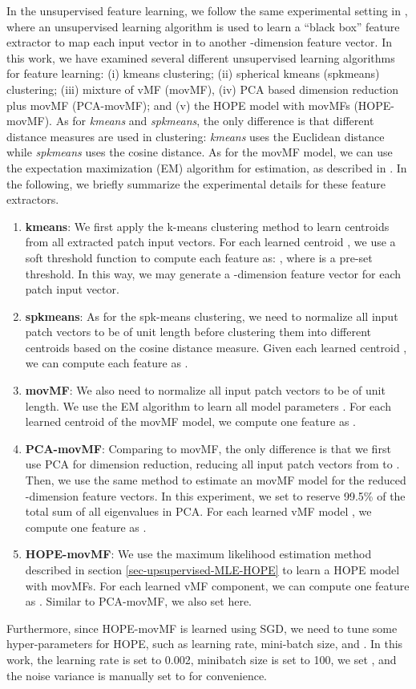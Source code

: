 \documentclass[11pt]{article}
\begin{document}
In the unsupervised feature learning, we follow the same experimental setting  in \cite{Coates2011}, where an unsupervised learning algorithm is used to learn a ``black box'' feature extractor to map each input vector in  to 
another -dimension feature vector. In this work, we have examined several different unsupervised learning algorithms for feature learning: (i) kmeans clustering; (ii) spherical kmeans (spkmeans) clustering; (iii) mixture of vMF (movMF), (iv) PCA based dimension reduction plus movMF (PCA-movMF); and (v) the HOPE model with movMFs (HOPE-movMF). As for {\em kmeans} and {\em spkmeans}, the only difference is that different distance measures are used in clustering: {\em kmeans} uses the Euclidean distance while {\em spkmeans} uses the cosine distance. As for the movMF model, we can use the expectation maximization (EM) algorithm for estimation, as described in \cite{Banerjee2005}. In the following, we  briefly summarize the experimental details for these feature extractors. 
 \begin{enumerate}
 	\item {\bf kmeans}: We first apply the k-means clustering method to learn  centroids  from all extracted patch input vectors. For each learned centroid ,  we use a soft threshold function to compute each feature as: , where  is a pre-set threshold. In this way, we may generate a -dimension feature vector for each patch input vector.  
 	\item {\bf spkmeans}: As for the spk-means clustering, we need to normalize all input patch vectors to be of unit length before clustering them into  different centroids based on the cosine distance measure.  Given each learned centroid , we can compute each feature as  .
 	\item {\bf movMF}: We also need to normalize all input patch vectors to be of unit length. We  use the EM algorithm to learn all model parameters . For each learned centroid  of the movMF model, we  compute one  feature as . 
 	\item {\bf PCA-movMF}:  Comparing to movMF, the only difference is that we first use PCA for dimension reduction, reducing all input patch vectors from  to . Then, we use the same method to estimate an movMF model for the reduced -dimension feature vectors. In this experiment, we set  to reserve 99.5\% of the total sum of all eigenvalues in PCA. For each learned vMF model , we  compute one  feature as . 
	\item {\bf HOPE-movMF}: We use the maximum likelihood estimation method described in section \ref{sec-upsupervised-MLE-HOPE} to learn a HOPE model with movMFs. For each learned vMF component,
we can compute one  feature as . Similar to PCA-movMF, we also set  here. 
 \end{enumerate}
Furthermore, since HOPE-movMF is learned using SGD,  we need to tune some hyper-parameters for HOPE, such as learning rate, mini-batch size,  and . In this work, the learning rate is set to 0.002, minibatch size is set to 100, we set , and the noise variance is manually set to  for convenience. 
\end{document}
